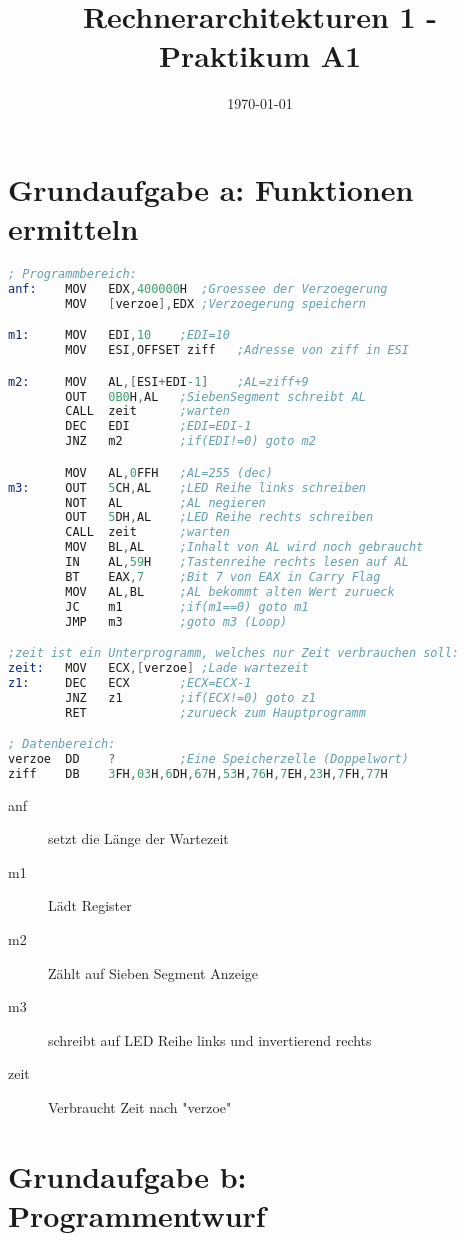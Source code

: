 \documentclass[10pt, a4paper]{report}
\title{Rechnerarchitekturen 1 - Praktikum A1}
\date\today
\begin{document}
\section*{ Grundaufgabe a: Funktionen ermitteln}
\begin{lstlisting}[language=Assembler]
; Programmbereich:
anf:    MOV   EDX,400000H  ;Groessee der Verzoegerung
        MOV   [verzoe],EDX ;Verzoegerung speichern

m1:     MOV   EDI,10    ;EDI=10
        MOV   ESI,OFFSET ziff   ;Adresse von ziff in ESI

m2:     MOV   AL,[ESI+EDI-1]    ;AL=ziff+9
        OUT   0B0H,AL   ;SiebenSegment schreibt AL
        CALL  zeit      ;warten
        DEC   EDI       ;EDI=EDI-1
        JNZ   m2        ;if(EDI!=0) goto m2

        MOV   AL,0FFH   ;AL=255 (dec)
m3:     OUT   5CH,AL    ;LED Reihe links schreiben
        NOT   AL        ;AL negieren
        OUT   5DH,AL    ;LED Reihe rechts schreiben
        CALL  zeit      ;warten
        MOV   BL,AL     ;Inhalt von AL wird noch gebraucht
        IN    AL,59H    ;Tastenreihe rechts lesen auf AL
        BT    EAX,7     ;Bit 7 von EAX in Carry Flag
        MOV   AL,BL     ;AL bekommt alten Wert zurueck
        JC    m1        ;if(m1==0) goto m1
        JMP   m3        ;goto m3 (Loop)

;zeit ist ein Unterprogramm, welches nur Zeit verbrauchen soll:
zeit:   MOV   ECX,[verzoe] ;Lade wartezeit
z1:     DEC   ECX       ;ECX=ECX-1
        JNZ   z1        ;if(ECX!=0) goto z1
        RET             ;zurueck zum Hauptprogramm

; Datenbereich:
verzoe  DD    ?         ;Eine Speicherzelle (Doppelwort)
ziff    DB    3FH,03H,6DH,67H,53H,76H,7EH,23H,7FH,77H
\end{lstlisting}

\begin{description}
    \item[anf] setzt die Länge der Wartezeit
    \item[m1] Lädt Register
    \item[m2] Zählt auf Sieben Segment Anzeige
    \item[m3] schreibt auf LED Reihe links und invertierend rechts
    \item[zeit] Verbraucht Zeit nach "verzoe"     
\end{description}

\clearpage

\section*{ Grundaufgabe b: Programmentwurf}
\end{document}
